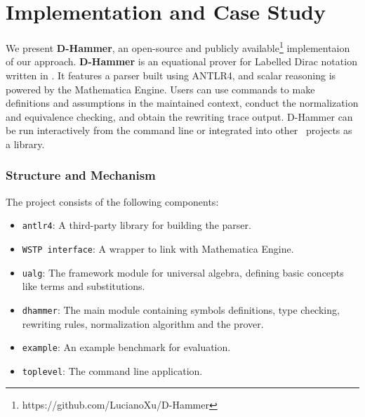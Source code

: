 
\section{Implementation and Case Study}
We present \textbf{D-Hammer}, an open-source and publicly
available\footnote{https://github.com/LucianoXu/D-Hammer} implementaion of our
approach.  \textbf{D-Hammer} is an equational prover for Labelled
Dirac notation written in \CC.  It features a parser built using
ANTLR4, and scalar reasoning is powered by the Mathematica
Engine. Users can use commands to make definitions and assumptions in
the maintained context, conduct the normalization and equivalence
checking, and obtain the rewriting trace output.  D-Hammer can be run
interactively from the command line or integrated into other
\CC\ projects as a library.


\subsubsection{Structure and Mechanism} 
The project consists of the following components:
\begin{itemize}
    \item \texttt{antlr4}: A third-party library for building the parser.
    \item \texttt{WSTP interface}: A wrapper to link with Mathematica Engine.
    \item \texttt{ualg}: The framework module for universal algebra, defining basic concepts like terms and substitutions.
    \item \texttt{dhammer}: The main module containing symbols definitions, type checking, rewriting rules, normalization algorithm and the prover.
    \item \texttt{example}: An example benchmark for evaluation.
    \item \texttt{toplevel}: The command line application.
\end{itemize}

% 

